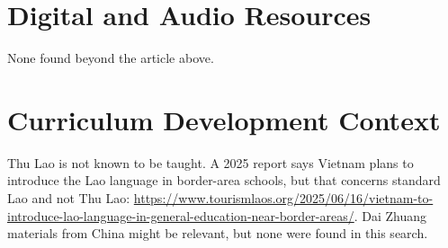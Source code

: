 \documentclass[12pt]{article}
\begin{document}
\section{Digital and Audio Resources}
None found beyond the article above.

\section{Curriculum Development Context}
Thu Lao is not known to be taught. A 2025 report says Vietnam plans to introduce the Lao language in border-area schools, but that concerns standard Lao and not Thu Lao: \url{https://www.tourismlaos.org/2025/06/16/vietnam-to-introduce-lao-language-in-general-education-near-border-areas/}. Dai Zhuang materials from China might be relevant, but none were found in this search.
\end{document}
